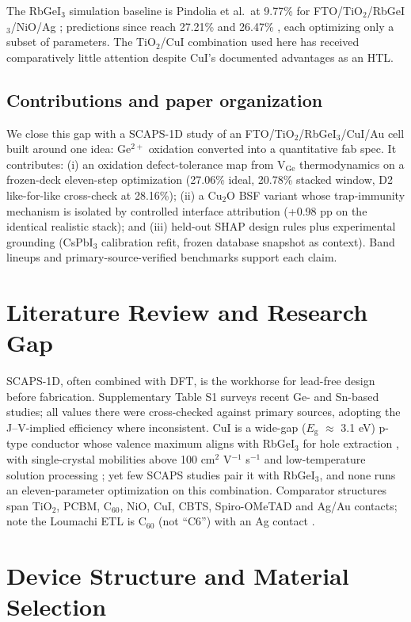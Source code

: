 \documentclass[aip,amsmath,amssymb,preprint]{revtex4-2}
\begin{document}
The RbGeI$_{3}$ simulation baseline is Pindolia et al.\ at 9.77\% for FTO/\allowbreak{}TiO$_{2}$/RbGeI$_{3}$/NiO/\allowbreak{}Ag \cite{r14}; predictions since reach 27.21\% \cite{r22} and 26.47\% \cite{r23}, each optimizing only a subset of parameters. The TiO$_{2}$/CuI combination used here has received comparatively little attention despite CuI's documented advantages as an HTL.

\subsection{Contributions and paper organization}
We close this gap with a SCAPS-1D study of an FTO/\allowbreak{}TiO$_{2}$/RbGeI$_{3}$/CuI/\allowbreak{}Au cell built around one idea: Ge$^{2+}$ oxidation converted into a quantitative fab spec. It contributes: (i) an oxidation defect-tolerance map from V$_{\mathrm{Ge}}$ thermodynamics on a frozen-deck eleven-step optimization (27.06\% ideal, 20.78\% stacked window, D2 like-for-like cross-check at 28.16\%); (ii) a Cu$_{2}$O BSF variant whose trap-immunity mechanism is isolated by controlled interface attribution (+0.98 pp on the identical realistic stack); and (iii) held-out SHAP design rules plus experimental grounding (CsPbI$_{3}$ calibration refit, frozen database snapshot as context). Band lineups and primary-source-verified benchmarks support each claim.


\section{Literature Review and Research Gap}
SCAPS-1D, often combined with DFT, is the workhorse for lead-free design before fabrication. Supplementary Table S1 surveys recent Ge- and Sn-based studies; all values there were cross-checked against primary sources, adopting the J--V-implied efficiency where inconsistent. CuI is a wide-gap ($E_{\mathrm{g}}$ $\approx$ 3.1 eV) p-type conductor whose valence maximum aligns with RbGeI$_{3}$ for hole extraction \cite{r25,r26}, with single-crystal mobilities above 100 cm$^{2}$ V$^{-1}$ s$^{-1}$ and low-temperature solution processing \cite{r27}; yet few SCAPS studies pair it with RbGeI$_{3}$, and none runs an eleven-parameter optimization on this combination. Comparator structures span TiO$_{2}$, PCBM, C$_{60}$, NiO, CuI, CBTS, Spiro-OMeTAD and Ag/Au contacts; note the Loumachi ETL is C$_{60}$ (not ``C6'') with an Ag contact \cite{r22}.

\section{Device Structure and Material Selection}
\end{document}
